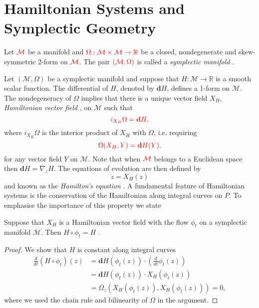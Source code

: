 \section{Hamiltonian Systems and Symplectic Geometry} \label{chap:Hasy:1}
Let $\color{red} \mathcal M$ be a manifold and $\color{red} \Omega:\mathcal M \times \mathcal M \to \mathbb R$ be a closed, nondegenerate {\edit and skew-symmetric} 2-form on $\color{red} \mathcal M$. The pair $\color{red} (\mathcal M,\Omega)$ is called a \emph{symplectic manifold} {\edit \cite{Marsden:1999ck}}. 


{\edit Let $(\mathcal M,\Omega)$ be a symplectic manifold and suppose that $H:\mathcal M \to \mathbb R$ is a smooth scalar function. The differential of $H$, denoted by $\mathbf dH$, defines a 1-form on $\mathcal M$. The nondegeneracy of $\Omega$ implies that there is a unique vector field $X_H$, \emph{Hamiltonian vector field }\cite{da2003introduction,Marsden:1999ck}, on $\mathcal M$ such that}
\begin{equation} \label{eq:Hasy:1}
	\edit i_{X_H} \Omega = \mathbf dH, 
\end{equation}
{\edit where $i_{X_H} \Omega$ is the interior product of $X_H$ with $\Omega$, i.e. requiring}
\begin{equation}
	\color{red} \Omega(X_H,Y) = \mathbf dH(Y),
\end{equation}
{\edit for any vector field $Y$ on $\mathcal M$.} Note that when $\color{red} \mathcal M$ belongs to a Euclidean space then $\mathbf d H = \nabla_z H$. The equations of evolution are then defined by
\begin{equation} \label{eq:Hasy:2}
	\dot z = X_H(z)
\end{equation}
and known as the \emph{Hamilton's equation} \cite{Marsden:1999ck}. A fundamental feature of Hamiltonian systems is the conservation of the Hamiltonian along integral curves on $P$. To emphasise the importance of this property we state

\begin{theorem} \label{theorem:Hasy:1}
Suppose that $X_H$ is a Hamiltonian vector field with the flow $\phi_t$ on a symplectic manifold $\mathcal M$. Then $H\circ \phi_t = H$ {\edit \cite{Marsden:1999ck}}.
\end{theorem}

\begin{proof}
We show that $H$ is constant along integral curves
\begin{equation} \label{eq:Hasy:3}
\begin{aligned}
	\frac{d}{dt}(H\circ \phi_t)(z) &= \mathbf d H(\phi_t(z)) \cdot( \frac{d}{dt} \phi_t(z) ) \\
	&= \mathbf d H (\phi_t(z))\cdot X_H(\phi_t(z)) \\
	&= \Omega_z( X_H(\phi_t(z)), X_H(\phi_t(z)) ) = 0,
\end{aligned}
\end{equation}
where we used the chain rule and bilinearity of $\Omega$ in the argument.
\end{proof}

